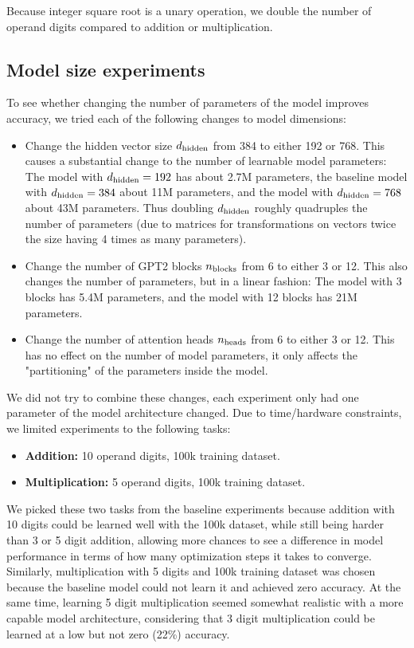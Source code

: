 Because integer square root is a unary operation, we double the number of operand digits compared to addition or multiplication.



\subsection{Model size experiments}
\label{setup:modelsize}

To see whether changing the number of parameters of the model improves accuracy, we tried each of the following changes to model dimensions:

\begin{itemize}
	\item Change the hidden vector size ${d_\textrm{hidden}}$ from 384 to either 192 or 768. This causes a substantial change to the number of learnable model parameters: The model with ${d_\textrm{hidden}}=192$ has about 2.7M parameters, the baseline model with ${d_\textrm{hidden}}=384$ about 11M parameters, and the model with ${d_\textrm{hidden}}=768$ about 43M parameters. Thus doubling ${d_\textrm{hidden}}$ roughly quadruples the number of parameters (due to matrices for transformations on vectors twice the size having 4 times as many parameters).
	\item Change the number of GPT2 blocks ${n_\textrm{blocks}}$ from 6 to either 3 or 12. This also changes the number of parameters, but in a linear fashion: The model with 3 blocks has 5.4M parameters, and the model with 12 blocks has 21M parameters. 
	\item Change the number of attention heads ${n_\textrm{heads}}$ from 6 to either 3 or 12. This has no effect on the number of model parameters, it only affects the "partitioning" of the parameters inside the model.
\end{itemize}

We did not try to combine these changes, each experiment only had one parameter of the model architecture changed.
Due to time/hardware constraints, we limited experiments to the following tasks:

\begin{itemize}
	\item \textbf{Addition:} 10 operand digits, 100k training dataset.
	\item \textbf{Multiplication:} 5 operand digits, 100k training dataset.
\end{itemize}

We picked these two tasks from the baseline experiments because addition with 10 digits could be learned well with the 100k dataset, while still being harder than 3 or 5 digit addition, allowing more chances to see a difference in model performance in terms of how many optimization steps it takes to converge.
Similarly, multiplication with 5 digits and 100k training dataset was chosen because the baseline model could not learn it and achieved zero accuracy. At the same time, learning 5 digit multiplication seemed somewhat realistic with a more capable model architecture, considering that 3 digit multiplication could be learned at a low but not zero (22\%) accuracy.

